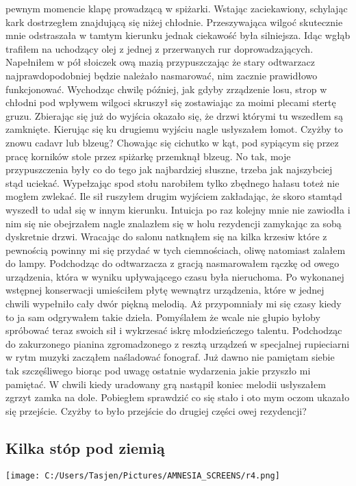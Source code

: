 \documentclass[12pt,a4paper]{report}
\begin{document}
pewnym momencie klapę prowadzącą w spiżarki. Wstając zaciekawiony, schylając kark dostrzegłem znajdującą się niżej chłodnie. Przeszywająca wilgoć skutecznie mnie odstraszała w tamtym kierunku jednak ciekawość była silniejsza. Idąc wgłąb trafiłem na uchodzący olej z jednej z przerwanych rur doprowadzających. Napełniłem w pół słoiczek ową mazią przypuszczając że stary odtwarzacz najprawdopodobniej będzie należało nasmarować, nim zacznie prawidłowo funkcjonować. Wychodząc chwilę później, jak gdyby zrządzenie losu, strop w chłodni pod wpływem wilgoci skruszył się zostawiając za moimi plecami stertę gruzu. Zbierając się już do wyjścia okazało się, że drzwi którymi tu wszedłem są zamknięte. Kierując się ku drugiemu wyjściu nagle usłyszałem łomot. Czyżby to znowu cadavr lub blzeug? Chowając się cichutko w kąt, pod sypiącym się przez pracę korników stole przez spiżarkę przemknął blzeug. No tak, moje przypuszczenia były co do tego jak najbardziej słuszne, trzeba jak najszybciej stąd uciekać. Wypełzając spod stołu narobiłem tylko zbędnego hałasu toteż nie mogłem zwlekać. Ile sił ruszyłem drugim wyjściem zakładając, że skoro stamtąd wyszedł to udał się w innym kierunku. Intuicja po raz kolejny mnie nie zawiodła i nim się nie obejrzałem nagle znalazłem się w holu rezydencji zamykając za sobą dyskretnie drzwi.  Wracając do salonu natknąłem się na kilka krzesiw które z pewnością powinny mi  się przydać w tych ciemnościach, oliwę natomiast zalałem do lampy. Podchodząc do odtwarzacza z gracją nasmarowałem rączkę od owego urządzenia, która w wyniku upływającego czasu była nieruchoma. Po wykonanej wstępnej konserwacji umieściłem płytę wewnątrz urządzenia, które w jednej chwili wypełniło cały dwór piękną melodią. Aż przypomniały mi się czasy kiedy to ja sam odgrywałem takie dzieła. Pomyślałem że wcale nie głupio byłoby spróbować teraz swoich sił i wykrzesać iskrę młodzieńczego talentu. Podchodząc do zakurzonego pianina zgromadzonego z resztą urządzeń w specjalnej rupieciarni w rytm muzyki zacząłem naśladować fonograf. Już dawno nie pamiętam siebie tak szczęśliwego biorąc pod uwagę ostatnie wydarzenia jakie przyszło mi pamiętać. W chwili kiedy uradowany grą nastąpił koniec melodii usłyszałem zgrzyt zamka na dole. Pobiegłem sprawdzić co się stało i oto mym oczom ukazało się przejście. Czyżby to było przejście do drugiej części owej rezydencji?
 
\subsection{Kilka stóp pod ziemią}
\begin{center}
\texttt{[image: C:/Users/Tasjen/Pictures/AMNESIA\_SCREENS/r4.png]} \\
\end{center}
\end{document}
